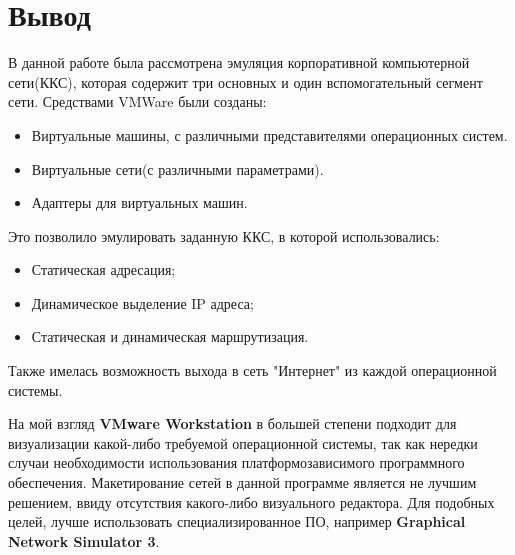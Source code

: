 \documentclass[a4paper, 12pt]{article}		%
\begin{document}
\section*{Вывод}
В данной работе была рассмотрена эмуляция корпоративной компьютерной сети(ККС), которая содержит три основных и один вспомогательный сегмент сети. Средствами VMWare были созданы:
\begin{itemize}
\item Виртуальные машины, с различными представителями операционных систем.
\item Виртуальные сети(с различными параметрами).
\item Адаптеры для виртуальных машин.
\end{itemize}
Это позволило эмулировать заданную ККС, в которой использовались:
\begin{itemize}
\item Статическая адресация;
\item Динамическое выделение IP адреса;
\item Статическая и динамическая маршрутизация.
\end{itemize}
Также имелась возможность выхода в сеть "Интернет"  из каждой операционной системы.

На мой взгляд \textbf{VMware Workstation} в большей степени подходит для визуализации какой-либо требуемой операционной системы, так как нередки случаи необходимости использования платформозависимого программного обеспечения. Макетирование сетей в данной программе является не лучшим решением, ввиду отсутствия какого-либо визуального редактора. Для подобных целей, лучше использовать специализированное ПО, например \textbf{Graphical Network Simulator 3}.

%
%
\end{document}
